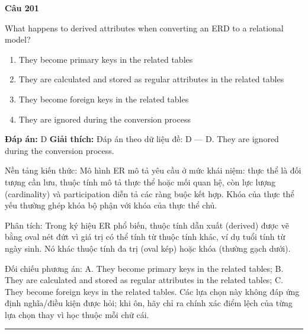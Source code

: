 \documentclass[11pt,a4paper]{article}
\newenvironment{question}[1]{%
  \par\vspace{1em}\noindent\textbf{\large Câu #1}\par\vspace{0.4em}
}{%
  \par\vspace{1em}\hrule\vspace{0.6em}
}
\newenvironment{choices}{%
  \begin{enumerate}[label=\textbf{\Alph*.},leftmargin=2.2em,itemsep=2pt,topsep=3pt]
}{%
  \end{enumerate}
}
\newcommand{\choice}{\item}
\begin{document}
\begin{question}{201}
What happens to derived attributes when converting an ERD to a relational model?
\begin{choices}
\choice They become primary keys in the related tables
\choice They are calculated and stored as regular attributes in the related tables
\choice They become foreign keys in the related tables
\choice They are ignored during the conversion process
\end{choices}
\textbf{Đáp án:} D
\textbf{Giải thích:} Đáp án theo dữ liệu đề: D — D. They are ignored during the conversion process.

Nền tảng kiến thức: Mô hình ER mô tả yêu cầu ở mức khái niệm: thực thể là đối tượng cần lưu, thuộc tính mô tả thực thể hoặc mối quan hệ, còn lực lượng (cardinality) và participation diễn tả các ràng buộc kết hợp. Khóa của thực thể yếu thường ghép khóa bộ phận với khóa của thực thể chủ.

Phân tích: Trong ký hiệu ER phổ biến, thuộc tính dẫn xuất (derived) được vẽ bằng oval nét đứt vì giá trị có thể tính từ thuộc tính khác, ví dụ tuổi tính từ ngày sinh. Nó khác thuộc tính đa trị (oval kép) hoặc khóa (thường gạch dưới).

Đối chiếu phương án: A. They become primary keys in the related tables; B. They are calculated and stored as regular attributes in the related tables; C. They become foreign keys in the related tables. Các lựa chọn này không đáp ứng định nghĩa/điều kiện được hỏi; khi ôn, hãy chỉ ra chính xác điểm lệch của từng lựa chọn thay vì học thuộc mỗi chữ cái.
\end{question}
\end{document}
